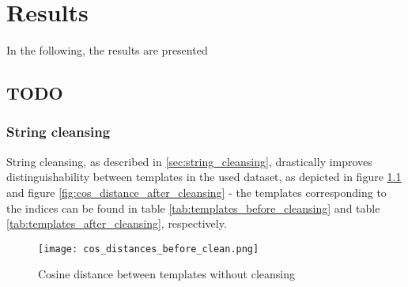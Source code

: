 \chapter{Results\label{cha:results}}

In the following, the results are presented

\section{TODO}
\subsection{String cleansing}
String cleansing, as described in \ref{sec:string_cleansing}, drastically improves distinguishability between templates in the used dataset, as depicted in figure \ref{fig:cos_distance_before_cleansing} and figure \ref{fig:cos_distance_after_cleansing} - the templates corresponding to the indices can be found in table \ref{tab:templates_before_cleansing} and table \ref{tab:templates_after_cleansing}, respectively.



\begin{figure}[h]
  \centering
  \texttt{[image: cos\_distances\_before\_clean.png]}\\
  \caption{Cosine distance between templates without cleansing}
  \label{fig:cos_distance_before_cleansing}
\end{figure}


